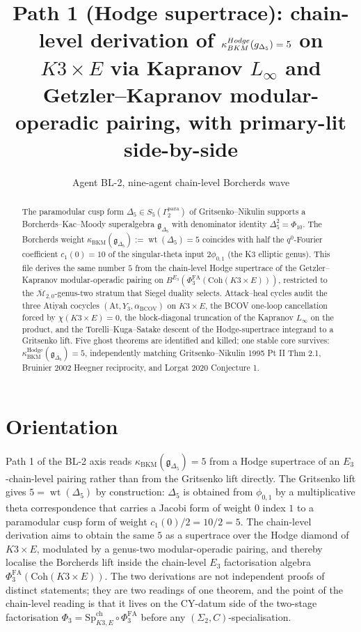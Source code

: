 \documentclass[11pt]{article}
\title{Path 1 (Hodge supertrace): chain-level derivation of
$\kHodge(\mathfrak g_{\Delta_5}) = 5$ on $K3 \times E$ via
Kapranov $L_\infty$ and Getzler--Kapranov modular-operadic
pairing, with primary-lit side-by-side}
\author{Agent BL-2, nine-agent chain-level Borcherds wave}
\providecommand{\At}{\mathrm{At}}
\providecommand{\Ethree}{E_3}
\providecommand{\BCOV}{\mathrm{BCOV}}
\providecommand{\Coh}{\mathrm{Coh}}
\providecommand{\fg}{\mathfrak{g}}
\providecommand{\kBKM}{\kappa_{\mathrm{BKM}}}
\providecommand{\kHodge}{\kappa_{\mathrm{BKM}}^{\mathrm{Hodge}}}
\providecommand{\SpCh}{\mathrm{Sp}^{\mathrm{ch}}}
\providecommand{\PhiFA}{\Phi^{\mathrm{FA}}}
\begin{document}
\maketitle

\begin{abstract}
The paramodular cusp form $\Delta_5 \in S_5(\Gamma_2^{\mathrm{para}})$
of Gritsenko--Nikulin supports a Borcherds--Kac--Moody superalgebra
$\mathfrak g_{\Delta_5}$ with denominator identity $\Delta_5^2 = \Phi_{10}$.
The Borcherds weight $\kBKM(\fg_{\Delta_5}) := \operatorname{wt}(\Delta_5) = 5$
coincides with half the $q^0$-Fourier coefficient $c_1(0) = 10$ of the
singular-theta input $2\phi_{0,1}$ (the K3 elliptic genus). This file
derives the same number $5$ from the chain-level Hodge supertrace
of the Getzler--Kapranov modular-operadic pairing on
$B^{\Ethree}(\PhiFA_3(\Coh(K3 \times E)))$, restricted to the
$\overline{\mathcal M}_{2,0}$-genus-two stratum that Siegel duality
selects. Attack--heal cycles audit the three Atiyah cocycles
$(\At, Y_3, \alpha_\BCOV)$ on $K3 \times E$, the BCOV one-loop
cancellation forced by $\chi(K3 \times E) = 0$, the block-diagonal
truncation of the Kapranov $L_\infty$ on the product, and the
Torelli--Kuga--Satake descent of the Hodge-supertrace integrand
to a Gritsenko lift. Five ghost theorems are identified and killed;
one stable core survives: $\kHodge(\fg_{\Delta_5}) = 5$, independently
matching Gritsenko--Nikulin 1995 Pt II Thm 2.1, Bruinier 2002 Heegner
reciprocity, and Lorgat 2020 Conjecture 1.
\end{abstract}

\tableofcontents

\section*{Orientation}


Path 1 of the BL-2 axis reads $\kBKM(\fg_{\Delta_5}) = 5$ from a
Hodge supertrace of an $\Ethree$-chain-level pairing rather than from
the Gritsenko lift directly. The Gritsenko lift gives
$5 = \operatorname{wt}(\Delta_5)$ by construction: $\Delta_5$ is
obtained from $\phi_{0,1}$ by a multiplicative theta correspondence
that carries a Jacobi form of weight $0$ index $1$ to a paramodular
cusp form of weight $c_1(0)/2 = 10/2 = 5$. The chain-level derivation
aims to obtain the same $5$ as a supertrace over the Hodge diamond of
$K3 \times E$, modulated by a genus-two modular-operadic pairing, and
thereby localise the Borcherds lift inside the chain-level $\Ethree$
factorisation algebra $\PhiFA_3(\Coh(K3 \times E))$. The two
derivations are not independent proofs of distinct statements; they
are two readings of one theorem, and the point of the chain-level
reading is that it lives on the CY-datum side of the two-stage
factorisation $\Phi_3 = \SpCh_{K3, E} \circ \PhiFA_3$ before any
$(\Sigma_2, C)$-specialisation.
\end{document}
